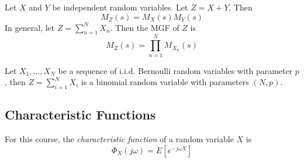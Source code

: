 Let $X$ and $Y$ be independent random variables.
Let $Z = X + Y$. Then
\begin{equation}
    M_Z(s) = M_X(s)M_Y(s)
\end{equation}
In general, let $Z = \sum_{n=1}^{N} X_n$. Then the
MGF of $Z$ is
\begin{equation}
    M_Z(s) = \prod_{n=1}^{N}M_{X_n}(s)
\end{equation}

Let $X_1, \dots, X_N$ be a sequence of i.i.d. Bernoulli
random variables with parameter $p$, then $Z = \sum_{i=1}^{N}X_i$
is a binomial random variable with parameters $(N, p)$.

\subsection{Characteristic Functions}
For this course, the \emph{characteristic function} of a
random variable $X$ is
\begin{equation}
    \Phi_X(j\omega) = E\left[e^{-j\omega X}\right]
\end{equation}